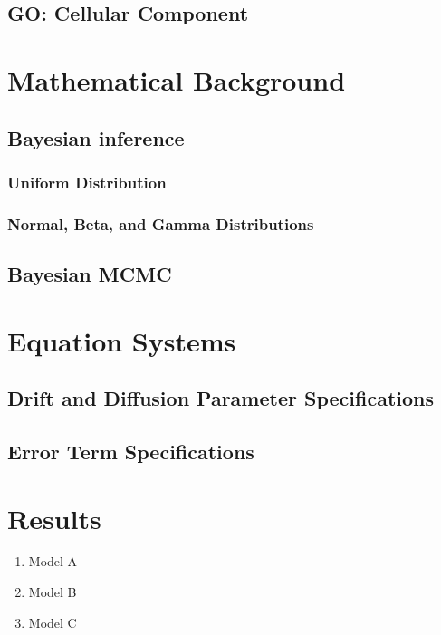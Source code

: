 \subsection{GO: Cellular Component}

\section{Mathematical Background}

\subsection{Bayesian inference}

\subsubsection{Uniform Distribution}

\subsubsection{Normal, Beta, and Gamma Distributions}

\subsection{Bayesian MCMC}

\section{Equation Systems}

\subsection{Drift and Diffusion Parameter Specifications}

\subsection{Error Term Specifications}

\section{Results}

\begin{enumerate}
	\item Model A
	\item Model B
	\item Model C
\end{enumerate}

